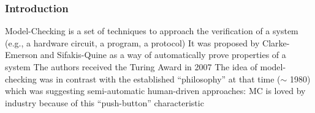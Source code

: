 \begin{frame}
  \frametitle{Introduction}

  Model-Checking is a set of techniques to approach the verification
  of a system (e.g., a hardware circuit, a program, a protocol)
  \vfill
  It was proposed by Clarke-Emerson and Sifakis-Quine
  as a way of automatically prove properties of a system
  \vfill
  The authors received the Turing Award in 2007
  \vfill
  The idea of model-checking was in 
  contrast with the established ``philosophy'' at that time ($\sim$ 1980) 
  which was suggesting semi-automatic human-driven approaches: 
  MC is loved by industry because of this ``push-button'' characteristic

\end{frame}
